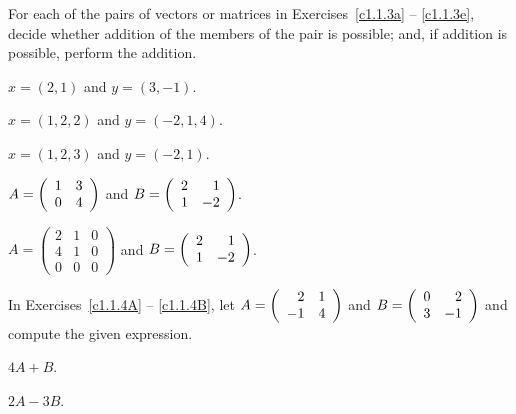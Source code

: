 \documentclass{ximera}
\begin{document}
\noindent For each of the pairs of vectors or matrices in
Exercises~\ref{c1.1.3a} -- \ref{c1.1.3e}, decide whether addition
of the members of the pair is possible; and, if addition is possible,
perform the addition.
\begin{exercise} \label{c1.1.3a}
$x=(2,1)$ and $y=(3,-1)$.
\end{exercise}
\begin{exercise} \label{c1.1.3b}
$x=(1,2,2)$ and $y=(-2,1,4)$.
\end{exercise}
\begin{exercise} \label{c1.1.3c}
$x=(1,2,3)$ and $y=(-2,1)$.
\end{exercise}
\begin{exercise} \label{c1.1.3d}
$A=\left(\begin{array}{rr} 1 & 3\\ 0 &4\end{array}\right)$ and $B=\left(\begin{array}{rr} 2 & 1\\ 1 &-2\end{array}\right)$.
\end{exercise}
\begin{exercise} \label{c1.1.3e}
$A=\left(\begin{array}{rrr} 2 & 1 & 0\\ 4 & 1 & 0\\
	0 & 0 & 0\end{array}\right)$ and $B=\left(\begin{array}{rr} 2 & 1\\ 1 &-2\end{array}\right)$.
\end{exercise}

\noindent In Exercises~\ref{c1.1.4A} -- \ref{c1.1.4B}, let
$A=\left(\begin{array}{rr} 2 & 1\\ -1 &4\end{array}\right)$ and $B=\left(\begin{array}{rr} 0 & 2\\ 3 &-1\end{array}\right)$ and compute the given 
expression.
\begin{exercise}  \label{c1.1.4A}
$4A+B$.
\end{exercise}
\begin{exercise}  \label{c1.1.4B}
$2A-3B$.
\end{exercise}
\end{document}
